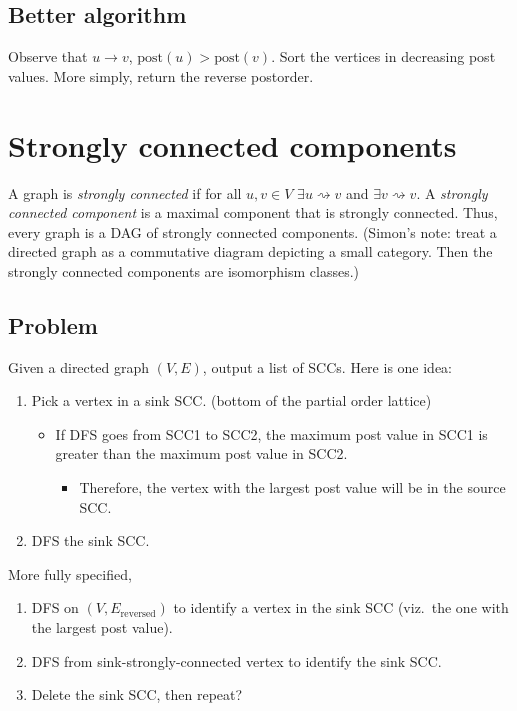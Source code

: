 \subsection{Better algorithm}
Observe that \(u\to v\), \(\text{post}(u) > \text{post}(v)\). Sort the vertices in decreasing post values. More simply, return the reverse postorder.

\section{Strongly connected components}
A graph is \emph{strongly connected} if for all \(u,v \in V\) \(\exists u\rightsquigarrow v\) and \(\exists v\rightsquigarrow v\).
A \emph{strongly connected component} is a maximal component that is strongly connected.
Thus, every graph is a DAG of strongly connected components.
(Simon's note: treat a directed graph as a commutative diagram depicting a small category. 
Then the strongly connected components are isomorphism classes.)

\subsection{Problem}
Given a directed graph \((V, E)\), output a list of SCCs. Here is one idea:
\begin{enumerate}
	\item Pick a vertex in a sink SCC. (bottom of the partial order lattice)
		\begin{itemize}
			\item If DFS goes from SCC1 to SCC2, the maximum post value in SCC1 is greater than the maximum post value in SCC2.
			\begin{itemize}
				\item Therefore, the vertex with the largest post value will be in the source SCC.
			\end{itemize}
		\end{itemize}
	\item DFS the sink SCC.
\end{enumerate}

More fully specified,
\begin{enumerate}
	\item DFS on \(\left(V, E_\text{reversed}\right)\) to identify a vertex in the sink SCC (viz.~the one with the largest post value).
	\item DFS from sink-strongly-connected vertex to identify the sink SCC.
	\item Delete the sink SCC, then repeat?
\end{enumerate}